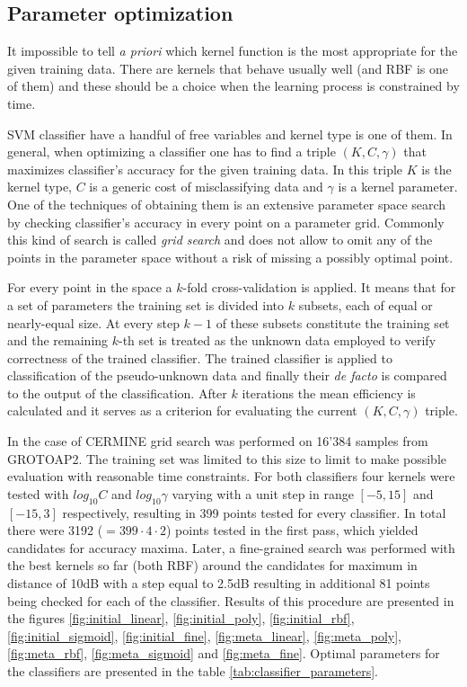 \subsection{Parameter optimization}
\label{sec:svm_optimization}
It impossible to tell \textit{a priori} which kernel function is the most appropriate for the given training data. There are kernels that behave usually well (and RBF is one of them) and these should be a choice when the learning process is constrained by time.

SVM classifier have a handful of free variables and kernel type is one of them. In general, when optimizing a classifier one has to find a triple $(K, C, \gamma)$ that maximizes classifier's accuracy for the given training data. In this triple $K$ is the kernel type, $C$ is a generic cost of misclassifying data and $\gamma$ is a kernel parameter. One of the techniques of obtaining them is an extensive parameter space search by checking classifier's accuracy in every point on a parameter grid. Commonly this kind of search is called \textit{grid search} and does not allow to omit any of the points in the parameter space without a risk of missing a possibly optimal point.

For every point in the space a $k$-fold cross-validation is applied. It means that for a set of parameters the training set is divided into $k$ subsets, each of equal or nearly-equal size. At every step $k-1$ of these subsets constitute the training set and the remaining $k$-th set is treated as the unknown data employed to verify correctness of the trained classifier. The trained classifier is applied to classification of the pseudo-unknown data and finally their \textit{de facto} is compared to the output of the classification. After $k$ iterations the mean efficiency is calculated and it serves as a criterion for evaluating the current $(K, C, \gamma)$ triple.


In the case of CERMINE grid search was performed on 16'384 samples from GROTOAP2. The training set was limited to this size to limit to make possible evaluation with reasonable time constraints. For both classifiers four kernels were tested with $log_{10}C$ and $log_{10}\gamma$ varying with a unit step in range $[-5,15]$ and $[-15,3]$ respectively, resulting in 399 points tested for every classifier. In total there were 3192 ($=399\cdot4\cdot2$) points tested in the first pass, which yielded candidates for accuracy maxima. Later, a fine-grained search was performed with the best kernels so far (both RBF) around the candidates for maximum in distance of 10dB with a step equal to 2.5dB resulting in additional 81 points being checked for each of the classifier. Results of this procedure are presented in the figures \ref{fig:initial_linear}, \ref{fig:initial_poly}, \ref{fig:initial_rbf}, \ref{fig:initial_sigmoid}, \ref{fig:initial_fine}, \ref{fig:meta_linear}, \ref{fig:meta_poly}, \ref{fig:meta_rbf}, \ref{fig:meta_sigmoid} and \ref{fig:meta_fine}. Optimal parameters for the classifiers are presented in the table \ref{tab:classifier_parameters}.


